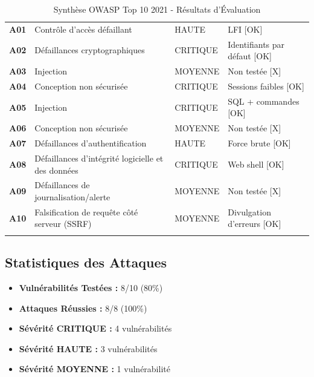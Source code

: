 \documentclass[12pt,a4paper,openany]{report}
\begin{document}
	\begin{longtable}{p{2.2cm} p{4.2cm} >{\centering\arraybackslash}p{2.2cm} p{4.2cm}}
		\hline
		\rowcolor{tablerowalt}
		\textbf{A01} & Contrôle d'accès défaillant & HAUTE & LFI [OK] \\
		
		\textbf{A02} & Défaillances cryptographiques & CRITIQUE & Identifiants par défaut [OK] \\
		
		\rowcolor{tablerowalt}
		\textbf{A03} & Injection & MOYENNE & Non testée [X] \\
		
		\textbf{A04} & Conception non sécurisée & CRITIQUE & Sessions faibles [OK] \\
		
		\rowcolor{tablerowalt}
		\textbf{A05} & Injection & CRITIQUE & SQL + commandes [OK] \\
		
		\textbf{A06} & Conception non sécurisée & MOYENNE & Non testée [X] \\
		
		\rowcolor{tablerowalt}
		\textbf{A07} & Défaillances d'authentification & HAUTE & Force brute [OK] \\
		
		\textbf{A08} & Défaillances d'intégrité logicielle et des données & CRITIQUE & Web shell [OK] \\
		
		\rowcolor{tablerowalt}
		\textbf{A09} & Défaillances de journalisation/alerte & MOYENNE & Non testée [X] \\
		
		\textbf{A10} & Falsification de requête côté serveur (SSRF) & MOYENNE & Divulgation d'erreurs [OK] \\
		
		\caption{Synthèse OWASP Top 10 2021 - Résultats d'Évaluation}
		\label{tab:owasp-summary}
	\end{longtable}
	
	\subsection{Statistiques des Attaques}
	
	\begin{itemize}
		\item \textbf{Vulnérabilités Testées :} 8/10 (80\%)
		\item \textbf{Attaques Réussies :} 8/8 (100\%)
		\item \textbf{Sévérité CRITIQUE :} 4 vulnérabilités
		\item \textbf{Sévérité HAUTE :} 3 vulnérabilités
		\item \textbf{Sévérité MOYENNE :} 1 vulnérabilité
	\end{itemize}
	
\end{document}

